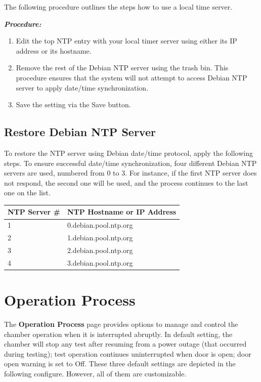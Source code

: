 The following procedure outlines the steps how to use a local time
server.

\textbf{\emph{Procedure:}}

\begin{enumerate}
\def\labelenumi{\arabic{enumi}.}
\tightlist
\item
  Edit the top NTP entry with your local timer server using either its
  IP address or its hostname.
\item
  Remove the rest of the Debian NTP server using the trash bin. This
  procedure ensures that the system will not attempt to access Debian
  NTP server to apply date/time synchronization.
\item
  Save the setting via the Save button.
\end{enumerate}


\subsection{Restore Debian NTP
Server}

To restore the NTP server using Debian date/time protocol, apply the
following steps. To ensure successful date/time synchronization, four
different Debian NTP servers are used, numbered from 0 to 3. For
instance, if the first NTP server does not respond, the second one will
be used, and the process continues to the last one on the list.

\begin{longtable}[]{@{}ll@{}}
\toprule
NTP Server \# & NTP Hostname or IP Address\tabularnewline
\midrule
\endhead
1 & 0.debian.pool.ntp.org\tabularnewline
2 & 1.debian.pool.ntp.org\tabularnewline
3 & 2.debian.pool.ntp.org\tabularnewline
4 & 3.debian.pool.ntp.org\tabularnewline
\bottomrule
\end{longtable}


\section{Operation Process}

The \textbf{Operation Process} page provides options to manage and
control the chamber operation when it is interrupted abruptly. In
default setting, the chamber will stop any test after resuming from a
power outage (that occurred during testing); test operation continues
uninterrupted when door is open; door open warning is set to Off. These
three default settings are depicted in the following configure. However,
all of them are customizable.

